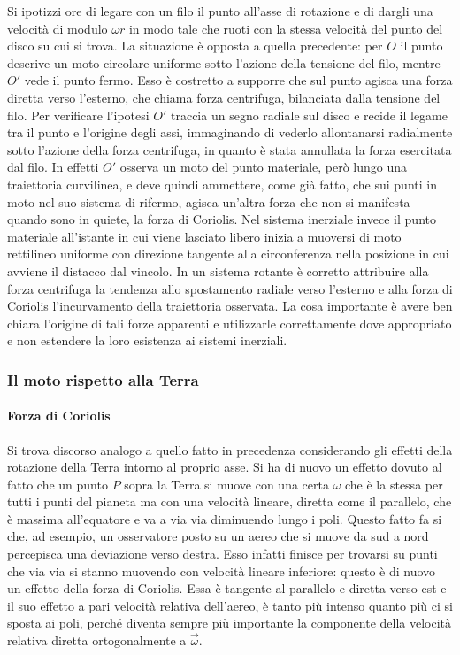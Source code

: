 \documentclass[10pt,a4paper]{book}
\begin{document}
Si ipotizzi ore di legare con un filo il punto all'asse di rotazione e di dargli una velocità di modulo $\omega r$ in modo tale che ruoti con la stessa velocità del punto del disco su cui si trova. La situazione è opposta a quella precedente: per $O$ il punto descrive un moto circolare uniforme sotto l'azione della tensione del filo, mentre $O'$ vede il punto fermo. Esso è costretto a supporre che sul punto agisca una forza diretta verso l'esterno, che chiama forza centrifuga, bilanciata dalla tensione del filo. Per verificare l'ipotesi $O'$ traccia un segno radiale sul disco e recide il legame tra il punto e l'origine degli assi, immaginando di vederlo allontanarsi radialmente sotto l'azione della forza centrifuga, in quanto è stata annullata la forza esercitata dal filo. In effetti $O'$ osserva un moto del punto materiale, però lungo una traiettoria curvilinea, e deve quindi ammettere, come già fatto, che sui punti in moto nel suo sistema di rifermo, agisca un'altra forza che non si manifesta quando sono in quiete, la forza di Coriolis. Nel sistema inerziale invece il punto materiale all'istante in cui viene lasciato libero inizia a muoversi di moto rettilineo uniforme con direzione tangente alla circonferenza nella posizione in cui avviene il distacco dal vincolo.  In un sistema rotante è corretto attribuire alla forza centrifuga la tendenza allo spostamento radiale verso l'esterno e alla forza di Coriolis l'incurvamento della traiettoria osservata. La cosa importante è avere ben chiara l'origine di tali forze apparenti e utilizzarle correttamente dove appropriato e non estendere la loro esistenza ai sistemi inerziali.

\subsubsection{Il moto rispetto alla Terra}

\paragraph{Forza di Coriolis} Si trova discorso analogo a quello fatto in precedenza considerando gli effetti della rotazione della Terra intorno al proprio asse. Si ha di nuovo un effetto dovuto al fatto che un punto $P$ sopra la Terra si muove con una certa $\omega$ che è la stessa per tutti i punti del pianeta ma con una velocità lineare, diretta come il parallelo, che è massima all'equatore e va a via via diminuendo lungo i poli. Questo fatto fa si che, ad esempio, un osservatore posto su un aereo che si muove da sud a nord percepisca una deviazione verso destra. Esso infatti finisce per trovarsi su punti che via via si stanno muovendo con velocità lineare inferiore: questo è di nuovo un effetto della forza di Coriolis. Essa è tangente al parallelo e diretta verso est e il suo effetto a pari velocità relativa dell'aereo, è tanto più intenso quanto più ci si sposta ai poli, perché diventa sempre più importante la componente della velocità relativa diretta ortogonalmente a $\vec{\omega}$.
\end{document}
